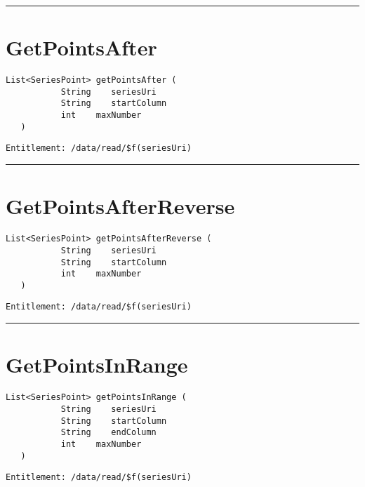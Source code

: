 \rule{12cm}{2pt}
\section{GetPointsAfter}
\label{Api:GetPointsAfter}
\begin{lstlisting}[style=nonumbers]
   List<SeriesPoint> getPointsAfter (
           String    seriesUri
           String    startColumn
           int    maxNumber
   )
\end{lstlisting}
\begin{Verbatim}[formatcom=\color{Maroon}]
  Entitlement: /data/read/$f(seriesUri)
\end{Verbatim}



\rule{12cm}{2pt}
\section{GetPointsAfterReverse}
\label{Api:GetPointsAfterReverse}
\begin{lstlisting}[style=nonumbers]
   List<SeriesPoint> getPointsAfterReverse (
           String    seriesUri
           String    startColumn
           int    maxNumber
   )
\end{lstlisting}
\begin{Verbatim}[formatcom=\color{Maroon}]
  Entitlement: /data/read/$f(seriesUri)
\end{Verbatim}



\rule{12cm}{2pt}
\section{GetPointsInRange}
\label{Api:GetPointsInRange}
\begin{lstlisting}[style=nonumbers]
   List<SeriesPoint> getPointsInRange (
           String    seriesUri
           String    startColumn
           String    endColumn
           int    maxNumber
   )
\end{lstlisting}
\begin{Verbatim}[formatcom=\color{Maroon}]
  Entitlement: /data/read/$f(seriesUri)
\end{Verbatim}



